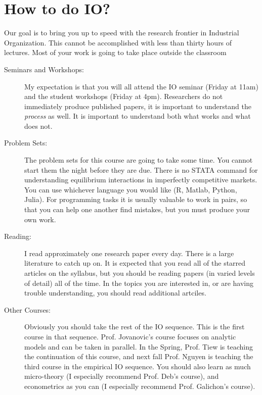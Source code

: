 \documentclass[11pt]{article}
\begin{document}
\section*{How to do IO?}
Our goal is to bring you up to speed with the research frontier in Industrial Organization. This cannot be accomplished with less than thirty hours of lectures. Most of your work is going to take place outside the classroom
\begin{description}
\item[Seminars and Workshops:] My expectation is that you will all attend the IO seminar (Friday at 11am) and the student workshops (Friday at 4pm). Researchers do not immediately produce published papers, it is important to understand the \textit{process} as well. It is important to understand both what works and what does not.
\item[Problem Sets:] The problem sets for this course are going to take some time. You cannot start them the night before they are due. There is no STATA command for understanding equilibrium interactions in imperfectly competitive markets. You can use whichever language you would like (R, Matlab, Python, Julia). For programming tasks it is usually valuable to work in pairs, so that you can help one another find mistakes, but you must produce your own work. 
\item[Reading:] I read approximately one research paper every day. There is a large literature to catch up on. It is expected that you read all of the starred articles on the syllabus, but you should be reading papers (in varied levels of detail) all of the time. In the topics you are interested in, or are having trouble understanding, you should read additional artciles.
\item[Other Courses:] Obviously you should take the rest of the IO sequence. This is the first course in that sequence. Prof. Jovanovic's course focuses on analytic models and can be taken in parallel. In the Spring, Prof. Tiew is teaching the continuation of this course, and next fall Prof. Nguyen is teaching the third course in the empirical IO sequence. You should also learn as much micro-theory (I especially recommend Prof. Deb's course), and econometrics as you can (I especially recommend Prof. Galichon's course).
\end{description}
\end{document}
